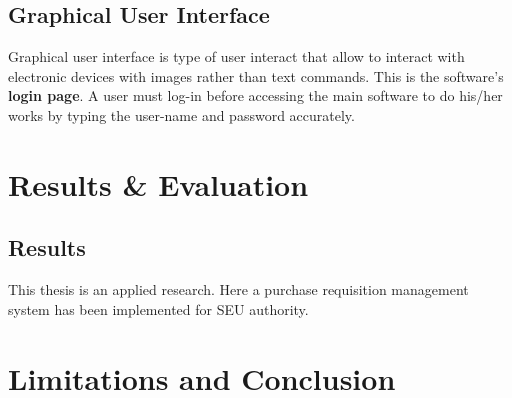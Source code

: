 \documentclass[12pt]{report} %
\begin{document}
\section{Graphical User Interface}
Graphical user interface is type of user interact that allow to interact with electronic devices with images rather than text commands. This is the software's \textbf{login page}. A user must log-in before accessing the main software to do his/her works by typing the user-name and password accurately. 
\fi






















\ifx
\chapter{Results \& Evaluation}
\setcounter{page}{1}
\thispagestyle{empty}    %

\section{Results}
This thesis is an applied research. Here a purchase requisition management system has been implemented for SEU authority.
\fi







\chapter{Limitations and Conclusion}
\setcounter{page}{1}
\thispagestyle{empty}    %
\end{document}
